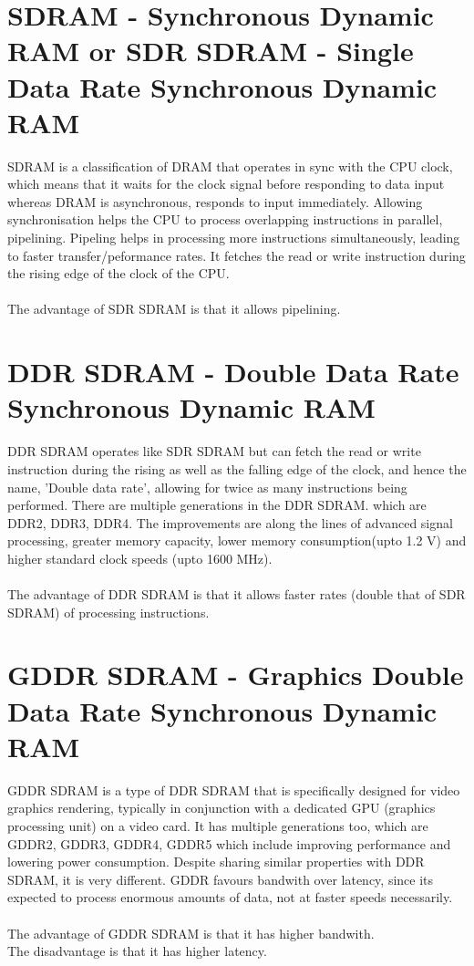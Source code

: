 \documentclass[a4paper,12pt]{article}
\begin{document}
\section{SDRAM - Synchronous Dynamic RAM or SDR SDRAM - Single Data Rate Synchronous Dynamic RAM}
SDRAM is a classification of DRAM that operates in sync with the CPU clock, which means that it waits for the clock signal before responding to data input whereas DRAM is asynchronous, \ie responds to input immediately. Allowing synchronisation helps the CPU to process overlapping instructions in parallel, \ie pipelining. Pipeling helps in processing more instructions simultaneously, leading to faster transfer/peformance rates. It fetches the read or write instruction during the rising edge of the clock of the CPU.
\\
\\The advantage of SDR SDRAM is that it allows pipelining. 

\section{DDR SDRAM - Double Data Rate Synchronous Dynamic RAM}
DDR SDRAM operates like SDR SDRAM but can fetch the read or write instruction during the rising as well as the falling edge of the clock, and hence the name, 'Double data rate', allowing for twice as many instructions being performed. There are multiple generations in the DDR SDRAM. which are DDR2, DDR3, DDR4. The improvements are along the lines of advanced signal processing, greater memory capacity, lower memory consumption(upto 1.2 V) and higher standard clock speeds (upto 1600 MHz).
\\
\\The advantage of DDR SDRAM is that it allows faster rates (double that of SDR SDRAM) of processing instructions.

\section{GDDR SDRAM - Graphics Double Data Rate Synchronous Dynamic RAM}
GDDR SDRAM is a type of DDR SDRAM that is specifically designed for video graphics rendering, typically in conjunction with a dedicated GPU (graphics processing unit) on a video card. It has multiple generations too, which are GDDR2, GDDR3, GDDR4, GDDR5 which include improving performance and lowering power consumption. Despite sharing similar properties with DDR SDRAM, it is very different. GDDR favours bandwith over latency, since its expected to process enormous amounts of data, not at faster speeds necessarily.
\\
\\The advantage of GDDR SDRAM is that it has higher bandwith.
\\The disadvantage is that it has higher latency.
\end{document}

